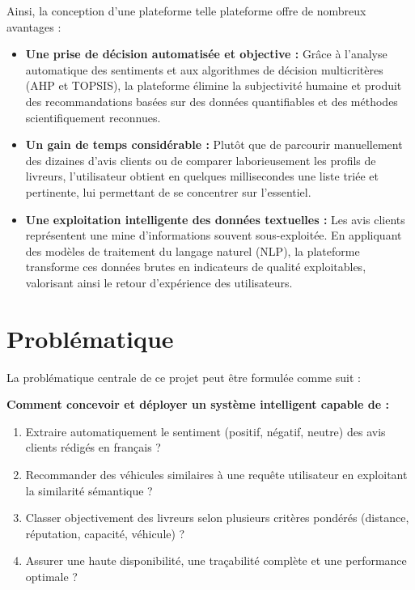 \documentclass[11pt,a4paper]{report}
\begin{document}
Ainsi, la conception d'une plateforme telle plateforme offre de nombreux avantages :

\begin{itemize}

    \item \textbf{Une prise de décision automatisée et objective :} Grâce à l'analyse automatique des sentiments et aux algorithmes de décision multicritères (AHP et TOPSIS), la plateforme élimine la subjectivité humaine et produit des recommandations basées sur des données quantifiables et des méthodes scientifiquement reconnues.

    \item \textbf{Un gain de temps considérable :} Plutôt que de parcourir manuellement des dizaines d'avis clients ou de comparer laborieusement les profils de livreurs, l'utilisateur obtient en quelques millisecondes une liste triée et pertinente, lui permettant de se concentrer sur l'essentiel.

\item \textbf{Une exploitation intelligente des données textuelles :} Les avis clients représentent une mine d'informations souvent sous-exploitée. En appliquant des modèles de traitement du langage naturel (NLP), la plateforme transforme ces données brutes en indicateurs de qualité exploitables, valorisant ainsi le retour d'expérience des utilisateurs.
\end{itemize}

\section{Problématique}

La problématique centrale de ce projet peut être formulée comme suit :

\begin{infobox}
    \textbf{Comment concevoir et déployer un système intelligent capable de :}
    \begin{enumerate}
        \item Extraire automatiquement le sentiment (positif, négatif, neutre) des avis clients rédigés en français ?
        \item Recommander des véhicules similaires à une requête utilisateur en exploitant la similarité sémantique ?
        \item Classer objectivement des livreurs selon plusieurs critères pondérés (distance, réputation, capacité, véhicule) ?
        \item Assurer une haute disponibilité, une traçabilité complète et une performance optimale ?
    \end{enumerate}
\end{infobox}
\end{document}
